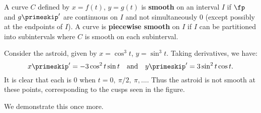 
{A curve $C$ defined by $x=f(t)$, $y=g(t)$ is \textbf{smooth} on an interval $I$ if $\fp$ and $g\primeskip'$ are continuous on $I$ and not simultaneously 0 (except possibly at the endpoints of $I$). A curve is \textbf{piecewise smooth} on $I$ if $I$ can be partitioned into subintervals where $C$ is smooth on each subinterval.
}

Consider the astroid, given by $x=\cos^3t$, $y=\sin^3t$. Taking derivatives, we have:
\[
x\primeskip' = -3\cos^2t\sin t\quad \text{and}\quad y\primeskip' = 3\sin^2t\cos t.
\]
It is clear that each is 0 when $t=0,\ \pi/2,\ \pi,\ldots$. Thus the astroid is not smooth at these points, corresponding to the cusps seen in the figure.


We demonstrate this once more.\\

